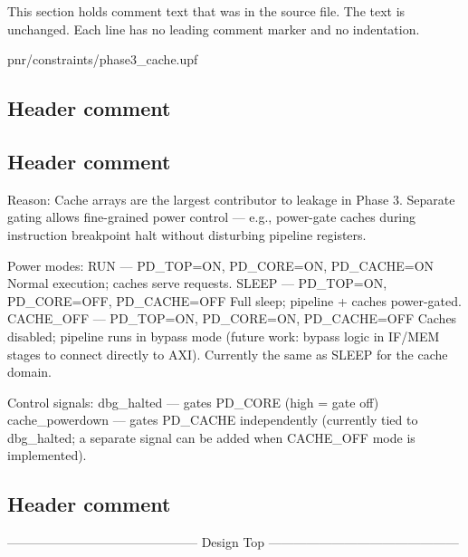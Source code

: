 This section holds comment text that was in the source file. The text is unchanged. Each line has no leading comment marker and no indentation.

\begin{relocated}{pnr/constraints/phase3_cache.upf}

\subsection*{Header comment}

\begin{textblock}

\end{textblock}

\subsection*{Header comment}

\begin{textblock}
             Reason: Cache arrays are the largest contributor to leakage
                     in Phase 3.  Separate gating allows fine-grained power
                     control — e.g., power-gate caches during instruction
                     breakpoint halt without disturbing pipeline registers.

Power modes:
  RUN        — PD_TOP=ON, PD_CORE=ON, PD_CACHE=ON
               Normal execution; caches serve requests.
  SLEEP      — PD_TOP=ON, PD_CORE=OFF, PD_CACHE=OFF
               Full sleep; pipeline + caches power-gated.
  CACHE_OFF  — PD_TOP=ON, PD_CORE=ON,  PD_CACHE=OFF
               Caches disabled; pipeline runs in bypass mode (future work:
               bypass logic in IF/MEM stages to connect directly to AXI).
               Currently the same as SLEEP for the cache domain.

Control signals:
  dbg_halted      — gates PD_CORE (high = gate off)
  cache_powerdown — gates PD_CACHE independently (currently tied to
                    dbg_halted; a separate signal can be added when
                    CACHE_OFF mode is implemented).
\end{textblock}

\subsection*{Header comment}

\begin{textblock}
---------------------------------------------
Design Top
---------------------------------------------
\end{textblock}

\end{relocated}

